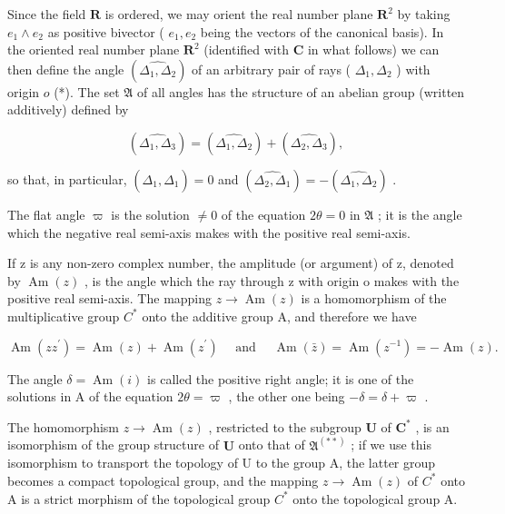 Since the field \(\mathbf{R}\) is ordered, we may orient the real number plane \(\mathbf{R}^2\) by taking \(e_1 \wedge e_2\) as positive bivector ( \(e_1, e_2\) being the vectors of the canonical basis). In the oriented real number plane \(\mathbf{R}^2\) (identified with \(\mathbf{C}\) in what follows) we can then define the angle \((\widehat{\Delta_1, \Delta_2})\) of an arbitrary pair of rays ( \(\Delta_1, \Delta_2\) ) with origin \(o\) (*). The set \(\mathfrak{A}\) of all angles has the structure of an abelian group (written additively) defined by

\[
(\widehat {\Delta_ {1} , \Delta_ {3}}) = (\widehat {\Delta_ {1} , \Delta_ {2}}) + (\widehat {\Delta_ {2} , \Delta_ {3}}),
\]

so that, in particular, \((\widehat{\Delta_1, \Delta_1}) = 0\) and \((\widehat{\Delta_2, \Delta_1}) = -(\widehat{\Delta_1, \Delta_2})\) .

The flat angle \(\varpi\) is the solution \(\neq 0\) of the equation \(2\theta = 0\) in \(\mathfrak{A}\) ; it is the angle which the negative real semi-axis makes with the positive real semi-axis.

If z is any non-zero complex number, the amplitude (or argument) of z, denoted by \(\operatorname{Am}(z)\) , is the angle which the ray through z with origin o makes with the positive real semi-axis. The mapping \(z \to \operatorname{Am}(z)\) is a homomorphism of the multiplicative group \(C^{*}\) onto the additive group A, and therefore we have

\[
\operatorname{Am} \left(z z ^ {\prime}\right) = \operatorname{Am} (z) + \operatorname{Am} \left(z ^ {\prime}\right) \quad \text { and } \quad \operatorname{Am} (\bar {z}) = \operatorname{Am} \left(z ^ {- 1}\right) = - \operatorname{Am} (z).
\]

The angle \(\delta = \operatorname{Am}(i)\) is called the positive right angle; it is one of the solutions in A of the equation \(2\theta = \varpi\) , the other one being \(-\delta = \delta + \varpi\) .

The homomorphism \(z \to \operatorname{Am}(z)\) , restricted to the subgroup \(\mathbf{U}\) of \(\mathbf{C}^*\) , is an isomorphism of the group structure of \(\mathbf{U}\) onto that of \(\mathfrak{A}^{(**)}\) ; if we use this isomorphism to transport the topology of U to the group A, the latter group becomes a compact topological group, and the mapping \(z \to \operatorname{Am}(z)\) of \(C^{*}\) onto A is a strict morphism of the topological group \(C^{*}\) onto the topological group A.

